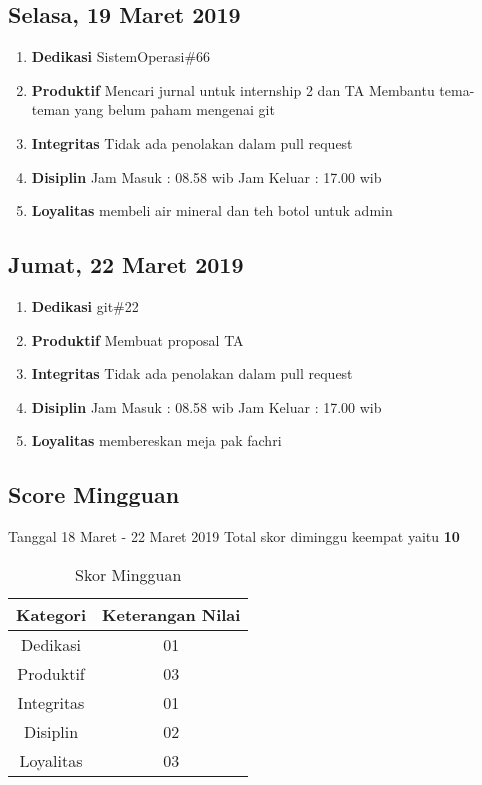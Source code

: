\subsection{Selasa, 19 Maret 2019}
\begin{enumerate}
\item \textbf{Dedikasi}
\subitem SistemOperasi\#66
\item \textbf{Produktif}
\subitem Mencari jurnal untuk internship 2 dan TA
\subitem Membantu tema-teman yang belum paham mengenai git
\item \textbf{Integritas}
\subitem Tidak ada penolakan dalam pull request
\item \textbf{Disiplin}
\subitem Jam Masuk : 08.58 wib
\subitem Jam Keluar : 17.00 wib
\item \textbf{Loyalitas}
\subitem membeli air mineral dan teh botol untuk admin
\end{enumerate}

\subsection{Jumat, 22 Maret 2019}
\begin{enumerate}
\item \textbf{Dedikasi}
\subitem git\#22
\item \textbf{Produktif}
\subitem Membuat proposal TA
\item \textbf{Integritas}
\subitem Tidak ada penolakan dalam pull request
\item \textbf{Disiplin}
\subitem Jam Masuk : 08.58 wib
\subitem Jam Keluar : 17.00 wib
\item \textbf{Loyalitas}
\subitem membereskan meja pak fachri
\end{enumerate}

\subsection{Score Mingguan} 
Tanggal 18 Maret - 22 Maret 2019 Total skor diminggu keempat yaitu \textbf{10}

\begin{table}[h]
\caption{Skor Mingguan}
\centering
\begin{tabular}{|c|c|}
\hline
\textbf{Kategori}&\textbf{Keterangan Nilai}\\
\hline
Dedikasi&01\\
\hline
Produktif&03\\
\hline
Integritas&01\\
\hline
Disiplin&02\\
\hline
Loyalitas&03\\
\hline
\end{tabular}
\label{table : skor minggu keempat}
\end{table}

